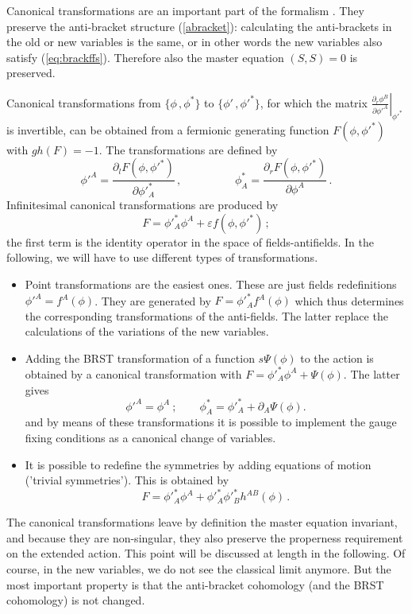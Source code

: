 \documentclass[a4paper,12pt]{article}
\begin{document}
Canonical transformations are an important part of the formalism  
\cite{cano}. 
They preserve the anti-bracket structure (\ref{abracket}): 
calculating the anti-brackets in the old or
new variables is the same, or in other words the new variables also
satisfy (\ref{eq:brackffs}). Therefore also
the master equation $(S,S)=0$ is preserved. 

Canonical transformations from $\{\phi\, , \phi ^*\}$ to $\{\phi'\, ,
\phi'^*\}$,  
for which the matrix $\left. \frac{\partial_r \phi^B}{\partial
    \phi'^A}\right|_{\phi'^*}$ 
is invertible, can be obtained from a fermionic generating 
function $F(\phi,\phi'^*)$ with $gh(F) = -1$. The transformations are
defined by 
\begin{equation} \phi'^A=\frac{\partial_l F(\phi , \phi'^*)
}{\partial \phi'^*_A} \, , \hspace{2cm}
\phi^*_A=\frac{\partial_r F(\phi , \phi'^*)}{\partial \phi ^A}\,.
\label{Fcan}
\end{equation}
Infinitesimal canonical transformations are produced by 
\begin{displaymath}
  F = \phi '^*_A\phi ^A + \varepsilon f(\phi,\phi'^*) \, ;
\end{displaymath}
the first term is the identity operator in the space of
fields-antifields. 
In the following, we will have to use different types of transformations. 
\begin{itemize}
\item Point transformations are the easiest ones. These are just
fields redefinitions $\phi '^A=f^A(\phi )$. They are generated 
by $F=\phi '^*_A f^A(\phi )$ which thus determines the corresponding
transformations of the anti-fields. The latter replace the calculations of
the variations of the new variables.

\item Adding the BRST transformation of a function $s\Psi(\phi )$ to the
action is obtained by a canonical transformation with $F=\phi '^*_A\phi ^A+
\Psi (\phi )$. The latter gives
\begin{equation}
\phi'^A = \phi^A \ ;\qquad
\phi ^*_A =\phi'^*_A + \partial _A \Psi (\phi ).
\label{gfermion}\end{equation}
and by means of these transformations it is possible to implement the
gauge fixing  
conditions as a canonical change of variables. 

\item It is possible to redefine the symmetries by adding equations of motion
('trivial symmetries'). This is obtained by
\begin{equation}\label{symm_remov}
F=\phi '^*_A\phi ^A+ \phi '^*_A\phi '^*_B h^{AB}(\phi ) \, .
\end{equation}
\end{itemize}
The canonical transformations leave by definition the master equation
invariant, and because they are non-singular, they also preserve the
properness requirement on the extended action. This point will be
discussed at length in the following. Of course, in the new variables,
we do not see the classical limit anymore. But the most important
property is that the anti-bracket cohomology \cite{anti_coho} (and the
BRST cohomology) is not changed.
\end{document}
